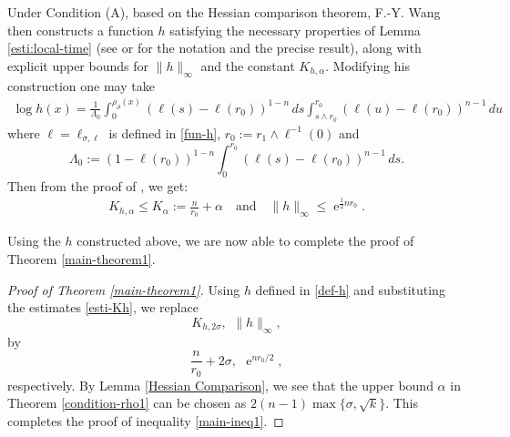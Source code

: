 \documentclass[11pt,reqno]{amsart}
\theoremstyle{definition} \newtheorem{remark}[theorem]{Remark}
\numberwithin{equation}{section}
\newcommand\1{\mathbbm{1}}
\def\r{\right}
\def\l{\left} \def\e{\operatorname{e}} \def\dsum{\displaystyle\sum}
\begin{document}
Under Condition (A), based on the Hessian comparison theorem, F.-Y. Wang then constructs a function $h$ satisfying the necessary properties of Lemma \ref{esti:local-time}
(see \cite[p.~1436]{W07} or \cite[Theorem 3.2.9]{Wbook2} for the notation and the precise result),
along with explicit upper bounds for $\|h\|_{\infty}$ and the constant $K_{h, \alpha}$.
Modifying his construction one may take
\begin{align}\label{def-h}
\log h(x)=\frac{1}{\Lambda_0}\int_0^{\rho_{\partial}(x)}\l(\ell(s)-\ell(r_0)\r)^{1-n}\, d s \int_{s\wedge r_0}^{r_0}\l(\ell(u)-\ell(r_0)\r)^{n-1}\,du
\end{align}
where $\ell=\ell_{\sigma, \ell}$ is defined in \eqref{fun-h}, $r_0:=r_1\wedge \ell^{-1}(0)$ and $$ \Lambda_0:=(1-\ell(r_0))^{1-n}\int_0^{r_0}\l(\ell(s)-\ell(r_0)\r)^{n-1}\, d s.$$
Then from the proof of \cite[Theorem 1.1]{Wa05}, we get:
\begin{align}\label{esti-Kh}
K_{h,\alpha}\leq {K}_{\alpha}:=\frac{n}{r_0}+\alpha \quad \mbox{and} \quad \|h\|_{\infty}\leq 
\e^{\frac12 n r_0}.
\end{align}

Using the $h$ constructed above, we are now able to complete the proof of Theorem \ref{main-theorem1}.

\begin{proof}[Proof of Theorem \ref{main-theorem1}]
Using $h$  defined in \eqref{def-h} and substituting the estimates \eqref{esti-Kh}, we
 replace 
 $$K_{h,2\sigma},\ \, \|h\|_{\infty},$$
 by
 $$\frac{n}{r_0}+2\sigma,\ \, \e^{nr_0/2},$$
 respectively.
 By Lemma \ref{Hessian Comparison}, we see that the upper bound $\alpha$ in Theorem \ref{condition-rho1}
 can be chosen as $2(n-1)\max\{\sigma, \sqrt{k}\}$.
 This completes the proof of inequality \eqref{main-ineq1}.
\end{proof}
\end{document}
